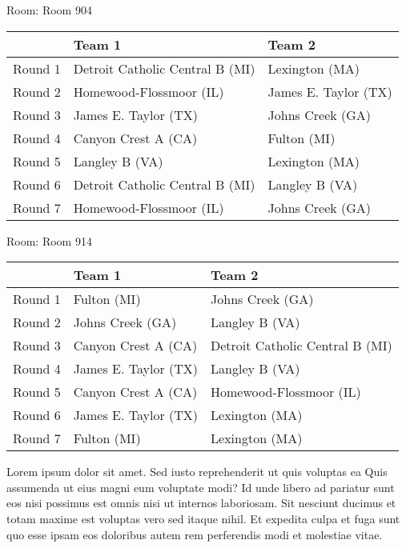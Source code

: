 \documentclass{article}%
\begin{document}
\vspace*{8pt}%
\linebreak%
\begin{flushleft}%
\begin{Large}%
Room: Room 904%
\end{Large}%
\end{flushleft}%
\begin{tabularx}{\textwidth}{|c|Y|Y|}%
\hline%
&Team 1&Team 2\\%
\hline%
Round 1&Detroit Catholic Central B (MI)&Lexington (MA)\\%
Round 2&Homewood{-}Flossmoor (IL)&James E. Taylor (TX)\\%
Round 3&James E. Taylor (TX)&Johns Creek (GA)\\%
Round 4&Canyon Crest A (CA)&Fulton (MI)\\%
Round 5&Langley B (VA)&Lexington (MA)\\%
Round 6&Detroit Catholic Central B (MI)&Langley B (VA)\\%
Round 7&Homewood{-}Flossmoor (IL)&Johns Creek (GA)\\%
\hline%
\end{tabularx}%
\vspace*{8pt}%
\linebreak%
\begin{flushleft}%
\begin{Large}%
Room: Room 914%
\end{Large}%
\end{flushleft}%
\begin{tabularx}{\textwidth}{|c|Y|Y|}%
\hline%
&Team 1&Team 2\\%
\hline%
Round 1&Fulton (MI)&Johns Creek (GA)\\%
Round 2&Johns Creek (GA)&Langley B (VA)\\%
Round 3&Canyon Crest A (CA)&Detroit Catholic Central B (MI)\\%
Round 4&James E. Taylor (TX)&Langley B (VA)\\%
Round 5&Canyon Crest A (CA)&Homewood{-}Flossmoor (IL)\\%
Round 6&James E. Taylor (TX)&Lexington (MA)\\%
Round 7&Fulton (MI)&Lexington (MA)\\%
\hline%
\end{tabularx}%
\vspace*{8pt}%
\linebreak%
\newline%
Lorem ipsum dolor sit amet. Sed iusto reprehenderit ut quis voluptas ea Quis assumenda ut eius magni eum voluptate modi? Id unde libero ad pariatur sunt eos nisi possimus est omnis nisi ut internos laboriosam. Sit nesciunt ducimus et totam maxime est voluptas vero sed itaque nihil. Et expedita culpa et fuga sunt quo esse ipsam eos doloribus autem rem perferendis modi et molestiae vitae.\newline%
\end{document}
